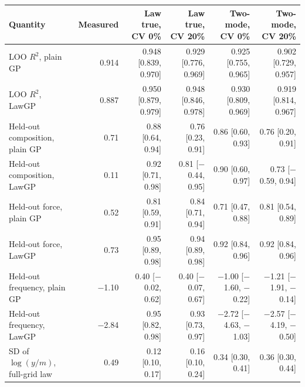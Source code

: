 \begin{tabular}{lrrrrr}
\toprule
Quantity & Measured & Law true, CV 0\% & Law true, CV 20\% & Two-mode, CV 0\% & Two-mode, CV 20\% \\
\midrule
LOO $R^2$, plain GP & 0.914 & 0.948 [0.839, 0.970] & 0.929 [0.776, 0.969] & 0.925 [0.755, 0.965] & 0.902 [0.729, 0.957] \\
LOO $R^2$, LawGP & 0.887 & 0.950 [0.879, 0.979] & 0.948 [0.846, 0.978] & 0.930 [0.809, 0.969] & 0.919 [0.814, 0.967] \\
Held-out composition, plain GP & 0.71 & 0.88 [0.64, 0.94] & 0.76 [0.23, 0.91] & 0.86 [0.60, 0.93] & 0.76 [0.20, 0.91] \\
Held-out composition, LawGP & 0.11 & 0.92 [0.71, 0.98] & 0.81 [$-$0.44, 0.95] & 0.90 [0.60, 0.97] & 0.73 [$-$0.59, 0.94] \\
Held-out force, plain GP & 0.52 & 0.81 [0.59, 0.91] & 0.84 [0.71, 0.94] & 0.71 [0.47, 0.88] & 0.81 [0.54, 0.89] \\
Held-out force, LawGP & 0.73 & 0.95 [0.89, 0.98] & 0.94 [0.89, 0.98] & 0.92 [0.84, 0.96] & 0.92 [0.84, 0.96] \\
Held-out frequency, plain GP & $-$1.10 & 0.40 [$-$0.02, 0.62] & 0.40 [$-$0.07, 0.67] & $-$1.00 [$-$1.60, $-$0.22] & $-$1.21 [$-$1.91, $-$0.14] \\
Held-out frequency, LawGP & $-$2.84 & 0.95 [0.82, 0.98] & 0.93 [0.73, 0.97] & $-$2.72 [$-$4.63, $-$1.03] & $-$2.57 [$-$4.19, $-$0.50] \\
SD of $\log(y/m)$, full-grid law & 0.49 & 0.12 [0.10, 0.17] & 0.16 [0.10, 0.24] & 0.34 [0.30, 0.41] & 0.36 [0.30, 0.44] \\
\bottomrule
\end{tabular}

